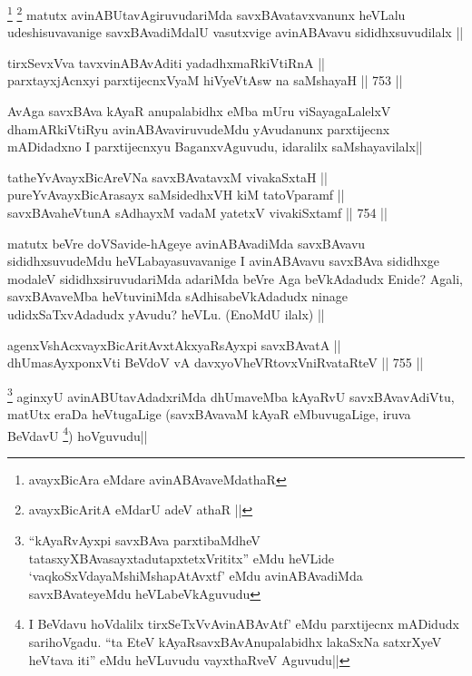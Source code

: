 \begin{artha}
\footnote{avayxBicAra eMdare avinABAvaveMdathaR}
\footnote{avayxBicAritA eMdarU adeV athaR ||}
matutx avinABUtavAgiruvudariMda savxBAvatavxvanunx heVLalu udeshisuvavanige savxBAvadiMdalU vasutxvige avinABAvavu sididhxsuvudilalx ||  
\end{artha}


\begin{shl}
tirxSevxVva tavxvinABAvAditi yadadhxmaRkiVtiRnA || \\
parxtayxjAcnxyi parxtijecnxVyaM hiVyeVtAsw na saMshayaH ||  753 ||  
\end{shl}

\begin{artha}
AvAga savxBAva kAyaR anupalabidhx eMba mUru viSayagaLalelxV dhamARkiVtiRyu avinABAvaviruvudeMdu yAvudanunx parxtijecnx mADidadxno I parxtijecnxyu BaganxvAguvudu, idaralilx saMshayavilalx||
\end{artha}

\begin{shl}
tatheYvAvayxBicAreVNa savxBAvatavxM vivakaSxtaH || \\
pureYvAvayxBicArasayx saMsidedhxVH kiM tatoV\s paramf || \\
savxBAvaheVtunA sAdhayxM vadaM yatetxV vivakiSxtamf ||  754 ||  
\end{shl}

\begin{artha}
matutx beVre doVSavide-hAgeye avinABAvadiMda savxBAvavu sididhxsuvudeMdu heVLabayasuvavanige I avinABAvavu savxBAva sididhxge modaleV sididhxsiruvudariMda adariMda beVre Aga beVkAdadudx Enide? Agali, savxBAvaveMba heVtuviniMda sAdhisabeVkAdadudx ninage udidxSaTxvAdadudx yAvudu? heVLu. (EnoMdU ilalx) || 
\end{artha}


\begin{shl}
agenxVshAcxvayxBicAritAvxtAkxyaRsAyxpi savxBAvatA || \\
dhUmasAyx\s \s ponxVti BeVdoV vA davxyoVheVRtovxVniRvataRteV ||  755 ||  
\end{shl}

\begin{artha}
\footnote{``kAyaRvAyxpi savxBAva parxtibaMdheV tatasxyXBAvasayxtadutapxtetxVrititx'' eMdu heVLide `vaqkoSxVdayaMshiMshapAtAvxtf' eMdu avinABAvadiMda savxBAvateyeMdu heVLabeVkAguvudu}
aginxyU avinABUtavAdadxriMda dhUmaveMba kAyaRvU savxBAvavAdiVtu, matUtx eraDa heVtugaLige (savxBAvavaM kAyaR eMbuvugaLige, iruva BeVdavU \footnote{I BeVdavu hoVdalilx tirxSeTxVvAvinABAvAtf' eMdu parxtijecnx mADidudx sarihoVgadu. ``ta EteV kAyaRsavxBAvAnupalabidhx lakaSxNa satxrXyeV heVtava iti'' eMdu heVLuvudu vayxthaRveV Aguvudu||}) hoVguvudu||
\end{artha}

